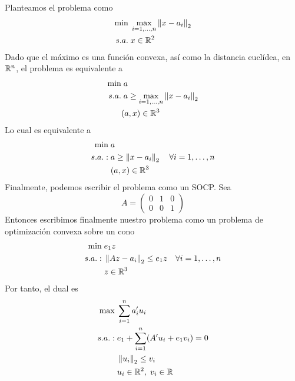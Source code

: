 \documentclass[twoside]{article}
\begin{document}
\begin{solucion}
Planteamos el problema como
\begin{align*}
\min &\; \max_{i=1,\dotsc,n}\left\lVert x-a_i\right\rVert_2\\
s.a.&\; x \in \mathbb{R}^2
\end{align*}
Dado que el máximo es una función convexa, así como la distancia euclídea, en $\mathbb{R}^n$, el problema es equivalente a 
\begin{align*}
\min &\; a\\
s.a.& \;a\geq \max_{i=1,\dotsc,n}\left\lVert x-a_i\right\rVert_2\\
&(a,x)\in \mathbb{R}^3
\end{align*}
Lo cual es equivalente a
\begin{align*}
\min &\; a\\
s.a.:& \;a\geq \left\lVert x-a_i\right\rVert_2 \quad \forall i = 1,\dotsc,n\\
&\;(a,x)\in \mathbb{R}^3
\end{align*}
Finalmente, podemos escribir el problema como un SOCP. Sea 
$$
A=\begin{pmatrix}
0 & 1 & 0\\
0 & 0 & 1
\end{pmatrix}
$$
Entonces escribimos finalmente nuestro problema como un problema de optimización convexa sobre un cono
\begin{align*}
\min &\; e_1 z \\
s.a.:& \; \left\lVert Az-a_i\right\rVert_2\leq e_1 z \quad \forall i = 1,\dotsc,n\\
&\;z\in \mathbb{R}^3
\end{align*}
Por tanto, el dual es
\begin{align*}
\max &\; \sum_{i=1}^n a_i'u_i  \\
s.a.:& \; e_1 + \sum_{i=1}^n (A'u_i + e_1 v_i) = 0\\
&\;\left\lVert u_i\right\rVert_2\leq v_i\\
&\;u_i\in \mathbb{R}^2,\; v_i \in \mathbb{R}
\end{align*}
\end{solucion}
\end{document}
